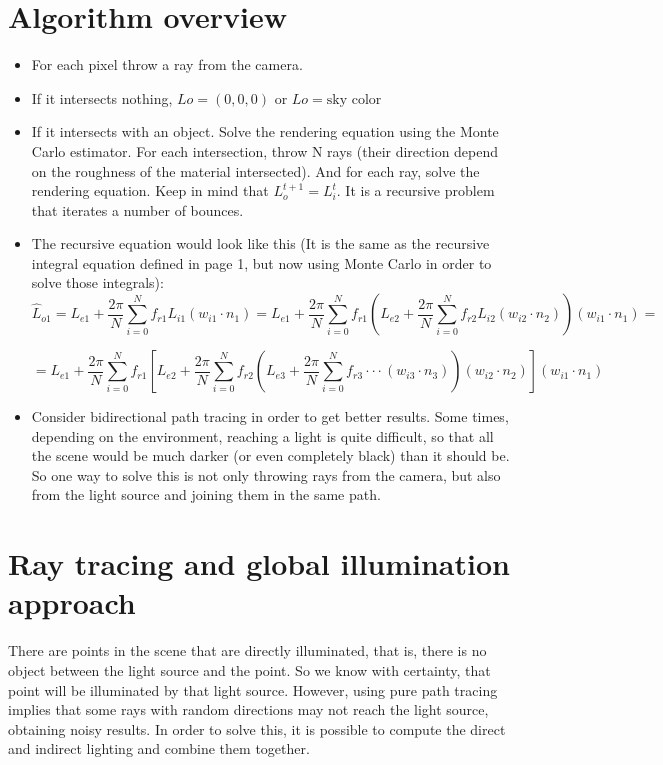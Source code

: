 \documentclass{article}
\begin{document}
\section{Algorithm overview}

\begin{itemize}
  \item For each pixel throw a ray from the camera.
  \item If it intersects nothing, $L{o} = (0,0,0)$ or $L{o} = \text{sky color}$
  \item If it intersects with an object. Solve the rendering equation using the Monte Carlo estimator. For each intersection, throw N rays (their direction depend on the roughness of the material intersected). And for each ray, solve the rendering equation. Keep in mind that $L_{o}^{t+1} = L_{i}^{t}$. It is a recursive problem that iterates a number of bounces.
  \item The recursive equation would look like this (It is the same as the recursive integral equation defined in page 1, but now using Monte Carlo in order to solve those integrals):
  $$\hat{L}_{o1} = L_{e1} + \frac{2\pi}{N}\sum_{i=0}^{N}f_{r1}L_{i1} \left ( w_{i1} \cdot n_{1} \right ) =  L_{e1} + \frac{2\pi}{N}\sum_{i=0}^{N}f_{r1} \left(  L_{e2} + \frac{2\pi}{N}\sum_{i=0}^{N}f_{r2}L_{i2} \left ( w_{i2} \cdot n_{2} \right ) \right) \left ( w_{i1} \cdot n_{1} \right )=$$

  $$=L_{e1} + \frac{2\pi}{N}\sum_{i=0}^{N}f_{r1} \left[  L_{e2} + \frac{2\pi}{N}\sum_{i=0}^{N}f_{r2} \left( L_{e3} + \frac{2\pi}{N }\sum_{i=0}^{N}f_{r3} \cdot \cdot \cdot \left ( w_{i3} \cdot n_{3} \right ) \right) \left ( w_{i2} \cdot n_{2} \right ) \right] \left ( w_{i1} \cdot n_{1} \right )$$
  \item Consider bidirectional path tracing in order to get better results. Some times, depending on the environment, reaching a light is quite difficult, so that all the scene would be much darker (or even completely black) than it should be. So one way to solve this is not only throwing rays from the camera, but also from the light source and joining them in the same path. 
\end{itemize}

\section{Ray tracing and global illumination approach}
There are points in the scene that are directly illuminated, that is, there is no object between the light source and the point. So we know with certainty, that point will be illuminated by that light source. However, using pure path tracing implies that some rays with random directions may not reach the light source, obtaining noisy results.\newline
In order to solve this, it is possible to compute the direct and indirect lighting and combine them together. 
\end{document}

